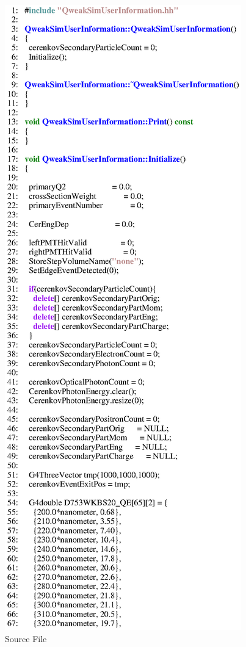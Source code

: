 \begin{figure}[h]
  \hspace{0cm}
  \includegraphics[scale=0.8]{./figures18/QweakSimUserInformation.cc-p1.eps}
  \caption{\label{SourceXVIII3} Source File}
           \label{fig:XVIII-SC-3}
\end{figure}
\clearpage

